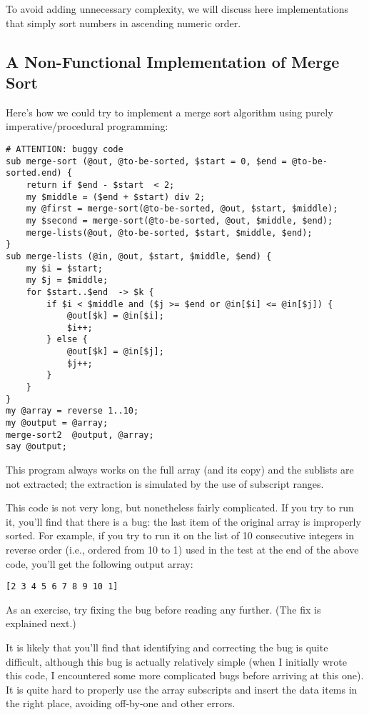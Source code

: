 To avoid adding unnecessary complexity, we will discuss here 
implementations that simply sort numbers in ascending numeric 
order.


\subsection{A Non-Functional Implementation of Merge Sort}

Here's how we could try to implement a merge sort algorithm using 
purely imperative/procedural programming:

\begin{verbatim}
# ATTENTION: buggy code
sub merge-sort (@out, @to-be-sorted, $start = 0, $end = @to-be-sorted.end) {
    return if $end - $start  < 2;
    my $middle = ($end + $start) div 2;
    my @first = merge-sort(@to-be-sorted, @out, $start, $middle);
    my $second = merge-sort(@to-be-sorted, @out, $middle, $end);
    merge-lists(@out, @to-be-sorted, $start, $middle, $end);
}
sub merge-lists (@in, @out, $start, $middle, $end) {
    my $i = $start;
    my $j = $middle;
    for $start..$end  -> $k {
        if $i < $middle and ($j >= $end or @in[$i] <= @in[$j]) {
            @out[$k] = @in[$i];
            $i++;
        } else {
            @out[$k] = @in[$j];
            $j++;
        } 
    }
}
my @array = reverse 1..10;
my @output = @array;
merge-sort2  @output, @array;
say @output;
\end{verbatim}

This program always works on the full array (and its copy) and 
the sublists are not extracted; the extraction is simulated by 
the use of subscript ranges.

This code is not very long, but nonetheless fairly complicated.
If you try to run it, you'll find that there is a bug: 
the last item of the original array is improperly sorted. For 
example, if you try to run it on the list of 10 consecutive 
integers in reverse order (i.e., ordered from 10 to 1) used in 
the test at the end of the above code, you'll get the following 
output array:

\begin{verbatim}
[2 3 4 5 6 7 8 9 10 1]
\end{verbatim}


As an exercise, try fixing the bug before reading any further. 
(The fix is explained next.)

It is likely that you'll find that identifying and correcting 
the bug is quite difficult, although this bug is actually 
relatively simple (when I initially wrote this code, I 
encountered some more complicated bugs before arriving at this one). 
It is quite hard to properly use the array subscripts and 
insert the data items in the right place, avoiding off-by-one 
and other errors.

